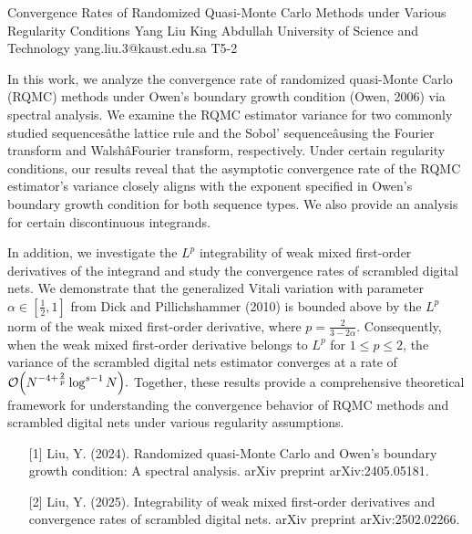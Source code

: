 \begin{talk}
  {Convergence Rates of Randomized Quasi-Monte Carlo Methods under Various Regularity Conditions}%
  {Yang Liu}%
  {King Abdullah University of Science and Technology}%
  {yang.liu.3@kaust.edu.sa}%
  {T5-2}%
        
        In this work, we analyze the convergence rate of randomized quasi-Monte Carlo (RQMC) methods under Owen's boundary growth condition (Owen, 2006) via spectral analysis. We examine the RQMC estimator variance for two commonly studied sequencesâthe lattice rule and the Sobol' sequenceâusing the Fourier transform and WalshâFourier transform, respectively. Under certain regularity conditions, our results reveal that the asymptotic convergence rate of the RQMC estimator's variance closely aligns with the exponent specified in Owen's boundary growth condition for both sequence types. We also provide an analysis for certain discontinuous integrands.

        In addition, we investigate the \(L^p\) integrability of weak mixed first-order derivatives of the integrand and study the convergence rates of scrambled digital nets. We demonstrate that the generalized Vitali variation with parameter \(\alpha \in \left[\frac{1}{2}, 1\right]\) from Dick and Pillichshammer (2010) is bounded above by the \(L^p\) norm of the weak mixed first-order derivative, where \(p = \frac{2}{3-2\alpha}\). Consequently, when the weak mixed first-order derivative belongs to \(L^p\) for \(1 \leq p \leq 2\), the variance of the scrambled digital nets estimator converges at a rate of
        \(
        \mathcal{O}\Bigl(N^{-4+\frac{2}{p}} \log^{s-1} N\Bigr).
        \)
        Together, these results provide a comprehensive theoretical framework for understanding the convergence behavior of RQMC methods and scrambled digital nets under various regularity assumptions.
        

\medskip

\begin{enumerate}
	\item[{[1]}] Liu, Y. (2024). Randomized quasi-Monte Carlo and Owen's boundary growth condition: A spectral analysis. arXiv preprint arXiv:2405.05181.
	\item[{[2]}] Liu, Y. (2025). Integrability of weak mixed first-order derivatives and convergence rates of scrambled digital nets. arXiv preprint arXiv:2502.02266.
\end{enumerate}


\end{talk}
